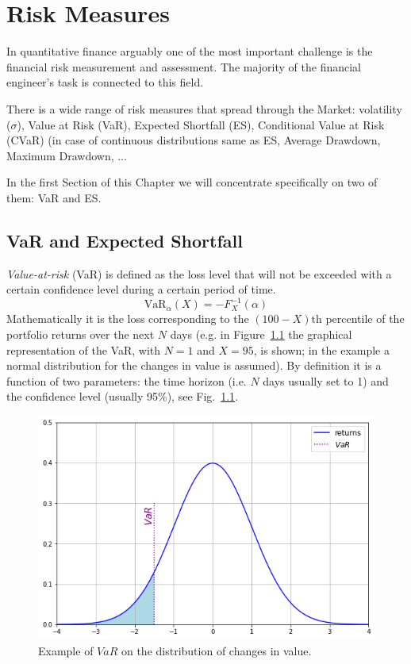 \chapter{Risk Measures}
\label{var-and-credit-risk}

In quantitative finance arguably one of the most important challenge is the financial risk measurement and assessment.
The majority of the financial engineer’s task is connected to this field.

There is a wide range of risk measures that spread through the Market: volatility ($\sigma$), Value at Risk (VaR), Expected Shortfall (ES), Conditional Value at Risk (CVaR) (in case of continuous distributions same as ES, Average Drawdown, Maximum Drawdown, $\ldots$

In the first Section of this Chapter we will concentrate specifically on two of them: VaR and ES.

\section{VaR and Expected Shortfall}
\label{value-at-risk}

\emph{Value-at-risk} (VaR) is defined as the loss level that will not be exceeded with a certain confidence level during a certain period of time.
\begin{equation}
\text{VaR}_{\alpha}(X) = -F^{-1}_X(\alpha)
\label{eq:var}
\end{equation}
Mathematically it is the loss corresponding to the $(100-X)\textrm{th}$ percentile of the portfolio returns over the next $N$ days (e.g. in Figure~\ref{fig:var_loss} the graphical representation of the VaR, with $N=1$ and $X=95$, is shown; in the example a normal distribution for the changes in value is assumed). By definition it is a function of two parameters: the time horizon (i.e. $N$ days usually set to 1) and the confidence level (usually 95\%), see Fig.~\ref{fig:var_loss}. 

\begin{figure}[htb]
\centering
\includegraphics[width=0.6\linewidth]{figures/95_var}
\caption{Example of $VaR$ on the distribution of changes in value.}
\label{fig:var_loss}
\end{figure}

